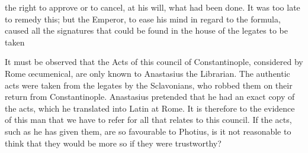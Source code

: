 the right to approve or to cancel, at his will, what had been done. It was too late to remedy this; but the Emperor, to ease his mind in regard to the formula, caused all the signatures that could be found in the house of the legates to be taken

It must be observed that the Acts of this council of Constantinople, considered by Rome œcumenical, are only known to Anastasius the Librarian. The authentic acts were taken from the legates by the Sclavonians, who robbed them on their return from Constantinople. Anastasius pretended that he had an exact copy of the acts, which he translated into Latin at Rome. It is therefore to the evidence of this man that we have to refer for all that relates to this council. If the acts, such as he has given them, are so favourable to Photius, is it not reasonable to think that they would be more so if they were trustworthy?


